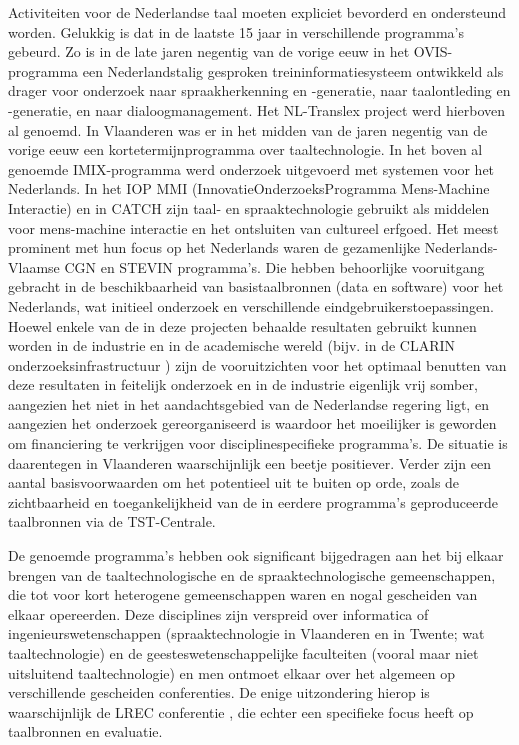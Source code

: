 \documentclass[]{../../metanetpaper}
\begin{document}
\begin{multicols}{2}
  Activiteiten voor de Nederlandse taal moeten expliciet bevorderd en ondersteund worden. Gelukkig is dat in de laatste 15 jaar in verschillende programma's gebeurd. Zo is in de late jaren negentig van de vorige eeuw in het OVIS-programma een Nederlandstalig gesproken treininformatiesysteem ontwikkeld als drager voor onderzoek naar spraakherkenning en -generatie, naar taalontleding en -generatie, en naar dialoogmanagement. Het NL-Translex project werd hierboven al genoemd. In Vlaanderen was er in het midden van de jaren negentig van de vorige eeuw een kortetermijnprogramma over taaltechnologie. In het boven al genoemde IMIX-programma werd onderzoek uitgevoerd met systemen voor het Nederlands. In het IOP MMI (InnovatieOnderzoeksProgramma Mens-Machine Interactie) en in CATCH \cite{CATCH}  zijn taal- en spraaktechnologie gebruikt als middelen voor mens-machine interactie en het ontsluiten van cultureel erfgoed. Het meest prominent met hun focus op het Nederlands waren de gezamenlijke Nederlands-Vlaamse CGN en STEVIN programma's. Die hebben behoorlijke vooruitgang gebracht in de beschikbaarheid van basistaalbronnen (data en software) voor het Nederlands, wat initieel onderzoek en verschillende eindgebruikerstoepassingen. Hoewel enkele van de in deze projecten behaalde resultaten gebruikt kunnen worden in de industrie en in de academische wereld (bijv. in de CLARIN onderzoeksinfrastructuur \cite{CLARIN-NL}) zijn de vooruitzichten voor het optimaal benutten van deze resultaten in feitelijk onderzoek en in de industrie eigenlijk vrij somber, aangezien het niet in het aandachtsgebied van de Nederlandse regering ligt, en aangezien het onderzoek gereorganiseerd is waardoor het moeilijker is geworden om financiering te verkrijgen voor disciplinespecifieke programma's. De situatie is daarentegen in Vlaanderen waarschijnlijk een beetje positiever. Verder zijn een aantal basisvoorwaarden om het potentieel uit te buiten op orde, zoals de zichtbaarheid en toegankelijkheid van de in eerdere programma's geproduceerde taalbronnen via de TST-Centrale.

  De genoemde programma's hebben ook significant bijgedragen aan het bij elkaar brengen van de taaltechnologische en de spraaktechnologische gemeenschappen, die tot voor kort heterogene gemeenschappen waren en nogal gescheiden van elkaar opereerden. Deze disciplines zijn verspreid over informatica of ingenieurswetenschappen (spraaktechnologie in Vlaanderen en in Twente; wat taaltechnologie) en de geesteswetenschappelijke faculteiten (vooral maar niet uitsluitend taaltechnologie) en men ontmoet elkaar over het algemeen op verschillende gescheiden conferenties. De enige uitzondering hierop is waarschijnlijk de LREC conferentie \cite{LREC}, die echter een specifieke focus heeft op taalbronnen en evaluatie.


\end{multicols}
\end{document}
